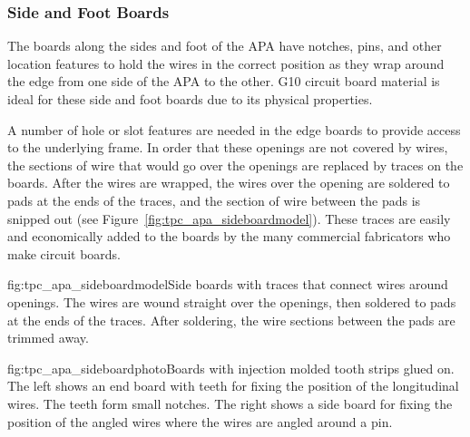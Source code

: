 \subsubsection{Side and Foot Boards}

The boards along the sides and foot of the APA have notches, pins, and other location features to hold the wires in the correct position as they wrap around the edge from one side of the APA to the other.  G10 circuit board material is ideal for these side and foot boards due to its physical properties. 

A number of hole or slot features are needed in the edge boards to provide access to the underlying frame.  In order that these openings are not covered by wires, the sections of wire that would go over the openings are replaced by traces on the boards.  After the wires are wrapped, the wires over the opening are soldered to pads at the ends of the traces, and the section of wire between the pads is snipped out (see Figure~\ref{fig:tpc_apa_sideboardmodel}).  These traces are easily and economically added to the boards by the many commercial fabricators who make circuit boards. 

\begin{dunefigure}{fig:tpc_apa_sideboardmodel}{Side boards with traces that connect wires around openings.  The wires are wound straight over the openings, then soldered to pads at the ends of the traces.  After soldering, the wire sections between the pads are trimmed away.}
\setlength{\fboxsep}{0pt}
\setlength{\fboxrule}{0.5pt}
\end{dunefigure}

\begin{dunefigure}{fig:tpc_apa_sideboardphoto}{Boards with injection molded tooth strips glued on.  The left shows an end board with teeth for fixing the position of the longitudinal wires.  The teeth form small notches. The right shows a side board for fixing the position of the angled wires where the wires are angled around a pin.}%
\setlength{\fboxsep}{0pt}
\setlength{\fboxrule}{0.5pt}
\end{dunefigure}

